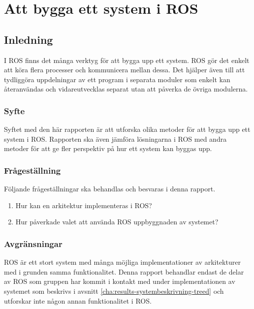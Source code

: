 \chapter{Att bygga ett system i ROS}
\label{cha:indiv-report-lundberg}

\section{Inledning}
\label{sec:introduction-lundberg}

I ROS finns det många verktyg för att bygga upp ett system. ROS gör det enkelt att köra flera processer och kommunicera mellan dessa. Det hjälper även till att tydliggöra uppdelningar av ett program i separata moduler som enkelt kan återanvändas och vidareutvecklas separat utan att påverka de övriga modulerna.


\subsection{Syfte}
\label{sec:purpose-lundberg}

Syftet med den här rapporten är att utforska olika metoder för att bygga upp ett system i ROS. Rapporten ska även jämföra lösningarna i ROS med andra metoder för att ge fler perspektiv på hur ett system kan byggas upp. 

\subsection{Frågeställning}
\label{sec:issue-lundberg}

Följande frågeställningar ska behandlas och besvaras i denna rapport.

\begin{enumerate}
	\item Hur kan en arkitektur implementeras i ROS?
	
	\item Hur påverkade valet att använda ROS uppbyggnaden av systemet?
\end{enumerate}

\subsection{Avgränsningar}
ROS är ett stort system med många möjliga implementationer av arkitekturer med i grunden samma funktionalitet. Denna rapport behandlar endast de delar av ROS som gruppen har kommit i kontakt med under implementationen av systemet som beskrivs i avsnitt \ref{cha:results-systembeskrivning-treed} och utforskar inte någon annan funktionalitet i ROS.


